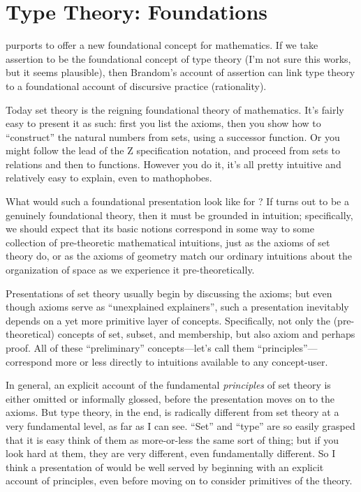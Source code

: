 \section{Type Theory: Foundations}
\label{sect:foundations}

\HoTT{} purports to offer a new foundational concept for mathematics.  If
we take assertion to be the foundational concept of type theory (I'm
not sure this works, but it seems plausible), then Brandom's account
of assertion can link type theory to a foundational account of
discursive practice (rationality).

Today set theory is the reigning foundational theory of mathematics.
It's fairly easy to present it as such: first you list the axioms,
then you show how to ``construct'' the natural numbers from sets,
using a successor function.  Or you might follow the lead of the Z
specification notation, and proceed from
sets to relations and then to functions.  However you do it, it's all
pretty intuitive and relatively easy to explain, even to mathophobes.

What would such a foundational presentation look like for \HoTT{}?  If
\HoTT{} turns out to be a genuinely foundational theory, then it must be
grounded in intuition; specifically, we should expect that its basic
notions correspond in some way to some collection of pre-theoretic
mathematical intuitions, just as the axioms of set theory do, or as
the axioms of geometry match our ordinary intuitions about the
organization of space as we experience it pre-theoretically.

Presentations of set theory usually begin by discussing the axioms;
but even though axioms serve as ``unexplained explainers'', such a
presentation inevitably depends on a yet more primitive layer of
concepts.  Specifically, not only the (pre-theoretical) concepts of
set, subset, and membership, but also axiom and perhaps proof.  All of
these ``preliminary'' concepts---let's call them
``principles''---correspond more or less directly to intuitions
available to any concept-user.

In general, an explicit account of the fundamental \textit{principles}
of set theory is either omitted or informally glossed, before the
presentation moves on to the axioms.  But type theory, in the end, is
radically different from set theory at a very fundamental level, as
far as I can see.  ``Set'' and ``type'' are so easily grasped that it
is easy think of them as more-or-less the same sort of thing; but if
you look hard at them, they are very different, even fundamentally
different.  So I think a presentation of \HoTT{} would be well served by
beginning with an explicit account of principles, even before moving
on to consider primitives of the theory.

